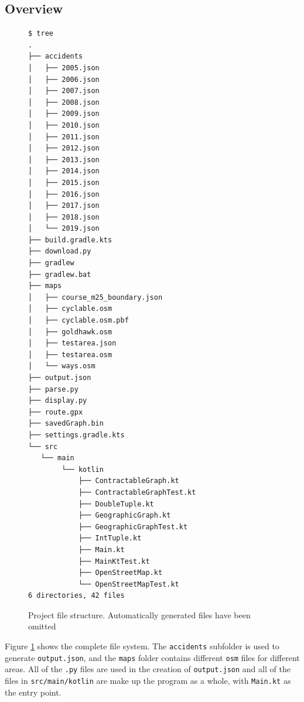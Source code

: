 \documentclass[11pt,twoside,a4paper]{article}
\begin{document}
\subsection{Overview}
\begin{figure}[p]
\begin{verbatim}
$ tree
.
├── accidents
│   ├── 2005.json
│   ├── 2006.json
│   ├── 2007.json
│   ├── 2008.json
│   ├── 2009.json
│   ├── 2010.json
│   ├── 2011.json
│   ├── 2012.json
│   ├── 2013.json
│   ├── 2014.json
│   ├── 2015.json
│   ├── 2016.json
│   ├── 2017.json
│   ├── 2018.json
│   └── 2019.json
├── build.gradle.kts
├── download.py
├── gradlew
├── gradlew.bat
├── maps
│   ├── course_m25_boundary.json
│   ├── cyclable.osm
│   ├── cyclable.osm.pbf
│   ├── goldhawk.osm
│   ├── testarea.json
│   ├── testarea.osm
│   └── ways.osm
├── output.json
├── parse.py
├── display.py
├── route.gpx
├── savedGraph.bin
├── settings.gradle.kts
└── src
   └── main
        └── kotlin
            ├── ContractableGraph.kt
            ├── ContractableGraphTest.kt
            ├── DoubleTuple.kt
            ├── GeographicGraph.kt
            ├── GeographicGraphTest.kt
            ├── IntTuple.kt
            ├── Main.kt
            ├── MainKtTest.kt
            ├── OpenStreetMap.kt
            └── OpenStreetMapTest.kt
6 directories, 42 files
\end{verbatim}
\caption{Project file structure. Automatically generated files have been omitted}
\label{fsystem}
\end{figure}
Figure \ref{fsystem} shows the complete file system. The \texttt{accidents} subfolder is used to generate \texttt{output.json}, and the \texttt{maps} folder contains different \texttt{osm} files for 
different areas. All of the \texttt{.py} files are used in the creation of \texttt{output.json} and all of the files in \texttt{src/main/kotlin} are make up the program as a whole, with \texttt{Main.kt} as the entry point.
\end{document}
